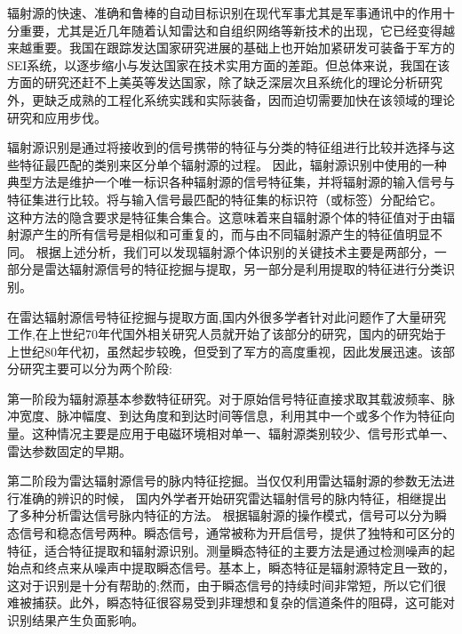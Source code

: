 辐射源的快速、准确和鲁棒的自动目标识别在现代军事尤其是军事通讯中的作用十分重要\cite{wiley2006elint}，尤其是近几年随着认知雷达\cite{kim2008specific}和自组织网络\cite{zhang2013self}等新技术的出现，它已经变得越来越重要。我国在跟踪发达国家研究进展的基础上也开始加紧研发可装备于军方的SEI系统，以逐步缩小与发达国家在技术实用方面的差距。但总体来说，我国在该方面的研究还赶不上美英等发达国家，除了缺乏深层次且系统化的理论分析研究外，更缺乏成熟的工程化系统实践和实际装备，因而迫切需要加快在该领域的理论研究和应用步伐。

辐射源识别是通过将接收到的信号携带的特征与分类的特征组进行比较并选择与这些特征最匹配的类别来区分单个辐射源的过程。
因此，辐射源识别中使用的一种典型方法是维护一个唯一标识各种辐射源的信号特征集，并将辐射源的输入信号与特征集进行比较。将与输入信号最匹配的特征集的标识符（或标签）分配给它\cite{Talbot2003Specific,Zanetti2012Exploring}。
这种方法的隐含要求是特征集合集合。这意味着来自辐射源个体的特征值对于由辐射源产生的所有信号是相似和可重复的，而与由不同辐射源产生的特征值明显不同\cite{Talbot2003Specific}。
根据上述分析，我们可以发现辐射源个体识别的关键技术主要是两部分，一部分是雷达辐射源信号的特征挖掘与提取，另一部分是利用提取的特征进行分类识别。

在雷达辐射源信号特征挖掘与提取方面,国内外很多学者针对此问题作了大量研究工作,在上世纪70年代国外相关研究人员就开始了该部分的研究\cite{therrien1974application}，国内的研究始于上世纪80年代初，虽然起步较晚，但受到了军方的高度重视，因此发展迅速。该部分研究主要可以分为两个阶段:

第一阶段为辐射源基本参数特征研究。对于原始信号特征直接求取其载波频率、脉冲宽度、脉冲幅度、到达角度和到达时间等信息\cite{徐欣2001雷达截获系统实时信号分选处理技术研究}，利用其中一个或多个作为特征向量。这种情况主要是应用于电磁环境相对单一、辐射源类别较少、信号形式单一、雷达参数固定的早期。

第二阶段为雷达辐射源信号的脉内特征挖掘。当仅仅利用雷达辐射源的参数无法进行准确的辨识的时候，
国内外学者开始研究雷达辐射信号的脉内特征，相继提出了多种分析雷达信号脉内特征的方法。
根据辐射源的操作模式，信号可以分为瞬态信号和稳态信号两种。瞬态信号，通常被称为开启信号，提供了独特和可区分的特征，适合特征提取和辐射源识别\cite{choe1995novel,ureten2005bayesian}。测量瞬态特征的主要方法是通过检测噪声的起始点和终点来从噪声中提取瞬态信号\cite{huang2000bayesian}。基本上，瞬态特征是辐射源特定且一致的，这对于识别是十分有帮助的;然而，由于瞬态信号的持续时间非常短，所以它们很难被捕获。此外，瞬态特征很容易受到非理想和复杂的信道条件的阻碍，这可能对识别结果产生负面影响\cite{xu2007identification}。

